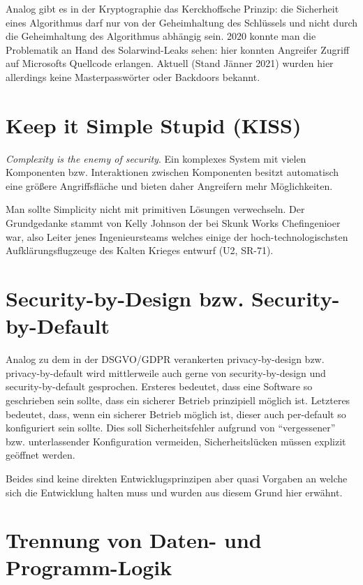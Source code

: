 Analog gibt es in der Kryptographie das Kerckhoffsche Prinzip: die Sicherheit eines Algorithmus darf nur von der Geheimhaltung des Schlüssels und nicht durch die Geheimhaltung des Algorithmus abhängig sein. 2020 konnte man die Problematik an Hand des Solarwind-Leaks sehen: hier konnten Angreifer Zugriff auf Microsofts Quellcode erlangen. Aktuell (Stand Jänner 2021) wurden hier allerdings keine Masterpasswörter oder Backdoors bekannt.

\section{Keep it Simple Stupid (KISS)}

\textit{Complexity is the enemy of security}. Ein komplexes System mit vielen Komponenten bzw. Interaktionen zwischen Komponenten besitzt automatisch eine größere Angriffsfläche und bieten daher Angreifern mehr Möglichkeiten.

Man sollte Simplicity nicht mit primitiven Lösungen verwechseln. Der Grundgedanke stammt von Kelly Johnson der bei Skunk Works Chefingenioer war, also Leiter jenes Ingenieursteams welches einige der hoch-technologischsten Aufklärungsflugzeuge des Kalten Krieges entwurf (U2, SR-71).

\section{Security-by-Design bzw. Security-by-Default}

Analog zu dem in der DSGVO/GDPR verankerten privacy-by-design bzw. privacy-by-default wird mittlerweile auch gerne von security-by-design und security-by-default gesprochen. Ersteres bedeutet, dass eine Software so geschrieben sein sollte, dass ein sicherer Betrieb prinzipiell möglich ist. Letzteres bedeutet, dass, wenn ein sicherer Betrieb möglich ist, dieser auch per-default so konfiguriert sein sollte. Dies soll Sicherheitsfehler aufgrund von ``vergessener'' bzw. unterlassender Konfiguration vermeiden, Sicherheitslücken müssen explizit geöffnet werden.

Beides sind keine direkten Entwicklugsprinzipen aber quasi Vorgaben an welche sich die Entwicklung halten muss und wurden aus diesem Grund hier erwähnt.

\section{Trennung von Daten- und Programm-Logik}

